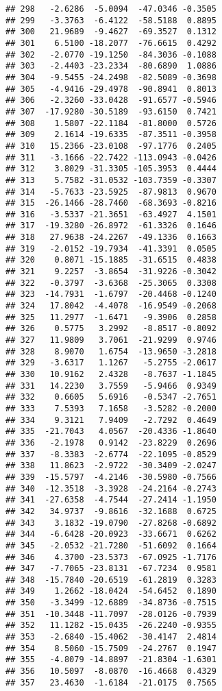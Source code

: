 \documentclass[
]{article}
\begin{document}
\begin{verbatim}
## 298   -2.6286  -5.0094  -47.0346 -0.3505
## 299   -3.3763  -6.4122  -58.5188  0.8895
## 300   21.9689  -9.4627  -69.3527  0.1312
## 301    6.5100 -18.2077  -76.6615  0.4292
## 302   -2.0770 -19.1250  -84.3036 -0.1088
## 303   -2.4403 -23.2334  -80.6890  1.0886
## 304   -9.5455 -24.2498  -82.5089 -0.3698
## 305   -4.9416 -29.4978  -90.8941  0.8013
## 306   -2.3260 -33.0428  -91.6577 -0.5946
## 307  -17.9280 -30.5189  -93.6150  0.7421
## 308    1.5807 -22.1184  -81.8000  0.5726
## 309    2.1614 -19.6335  -87.3511 -0.3958
## 310   15.2366 -23.0108  -97.1776  0.2405
## 311   -3.1666 -22.7422 -113.0943 -0.0426
## 312    3.8029 -31.3305 -105.3953  0.4444
## 313    5.7582 -31.0532 -103.7359 -0.3307
## 314   -5.7633 -23.5925  -87.9813  0.9670
## 315  -26.1466 -28.7460  -68.3693 -0.8216
## 316   -3.5337 -21.3651  -63.4927  4.1501
## 317  -19.3280 -26.8972  -61.3326  0.1646
## 318   27.9638 -24.2267  -49.1336  0.1663
## 319   -2.0152 -19.7934  -41.3391  0.0505
## 320    0.8071 -15.1885  -31.6515  0.4838
## 321    9.2257  -3.8654  -31.9226 -0.3042
## 322   -0.3797  -3.6368  -25.3065  0.3308
## 323  -14.7931  -1.6797  -20.4468 -0.1240
## 324   17.8042  -4.4078  -16.9549 -0.2068
## 325   11.2977  -1.6471   -9.3906  0.2858
## 326    0.5775   3.2992   -8.8517 -0.8092
## 327   11.9809   3.7061  -21.9299  0.9746
## 328    8.9070   1.6754  -13.9650 -3.2818
## 329   -3.6317   1.1267   -5.2755 -2.0617
## 330   10.9162   2.4328   -8.7637 -1.1845
## 331   14.2230   3.7559   -5.9466  0.9349
## 332    0.6605   5.6916   -0.5347 -2.7651
## 333    7.5393   7.1658   -3.5282 -0.2000
## 334    9.3121   7.9409   -2.7292  0.4649
## 335  -21.7043   4.0567  -20.4336 -1.8640
## 336   -2.1978   0.9142  -23.8229  0.2696
## 337   -8.3383  -2.6774  -22.1095 -0.8529
## 338   11.8623  -2.9722  -30.3409 -2.0247
## 339  -15.5797  -4.2146  -30.5980 -0.7566
## 340  -12.3518  -3.3928  -24.2164 -0.2743
## 341  -27.6358  -4.7544  -27.2414 -1.1950
## 342   34.9737  -9.8616  -32.1688  0.6725
## 343    3.1832 -19.0790  -27.8268 -0.6892
## 344   -6.6428 -20.0923  -33.6671  0.6262
## 345   -2.0532 -21.7280  -51.6092  0.1664
## 346    4.3700 -23.5373  -67.0925 -1.7176
## 347   -7.7065 -23.8131  -67.7234  0.9581
## 348  -15.7840 -20.6519  -61.2819  0.3283
## 349    1.2662 -18.0424  -54.6452  0.1890
## 350   -3.3499 -12.6889  -34.8736 -0.7515
## 351  -10.3448 -11.7097  -28.0126 -0.7939
## 352   11.1282 -15.0435  -26.2240 -0.9355
## 353   -2.6840 -15.4062  -30.4147  2.4814
## 354    8.5060 -15.7509  -24.2767  0.1947
## 355   -4.8079 -14.8897  -21.8304 -1.6301
## 356   10.5097  -8.0870  -16.4668  0.4329
## 357   23.4630  -1.6184  -21.0175  0.7565

\end{verbatim}
\end{document}

